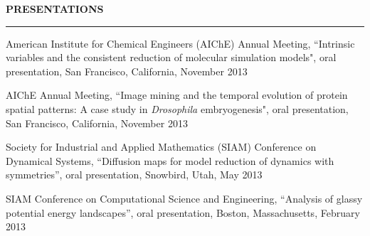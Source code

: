 \documentclass[letterpaper,10pt]{article}
\newenvironment{itemize*}
  {\begin{itemize}
    \setlength{\parskip}{-3pt}}
  {\end{itemize}}
\newcommand{\cvheading}[1]{
\vspace{0.05in}
\noindent
\MakeUppercase{\bf #1}
\vspace{0.06in}
{\hrule height 0.3mm}
\vspace{0.06in}}
\begin{document}
\cvheading{Presentations}
\begin{itemize*}
\item American Institute for Chemical Engineers  (AIChE) Annual Meeting,  ``Intrinsic variables and the consistent reduction of molecular simulation models", oral presentation, San Francisco, California, November 2013
\item AIChE Annual Meeting, ``Image mining and the temporal evolution of protein spatial patterns: A case study in {\it Drosophila} embryogenesis", oral presentation, San Francisco, California, November 2013
\item Society for Industrial and Applied Mathematics (SIAM) Conference on Dynamical Systems, ``Diffusion maps for model reduction of dynamics with symmetries'', oral presentation, Snowbird, Utah, May 2013
\item SIAM Conference on Computational Science and Engineering, ``Analysis of glassy potential energy landscapes'', oral presentation, Boston, Massachusetts, February 2013
\end{itemize*}

\end{document}
